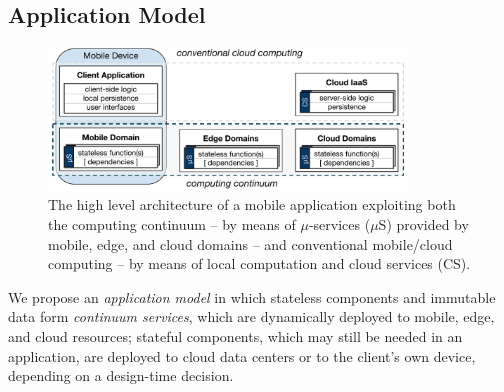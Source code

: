 




\subsection{Application Model}\label{sec:application_model}

\begin{figure}[tbp]
	\includegraphics[width=0.85\textwidth]{figs/Continuum-arch}
	\setlength{\belowcaptionskip}{-10pt}
	\caption{The high level architecture of a mobile application exploiting both the computing continuum -- by means of $\mu$-services ($\mu$S) provided by mobile, edge, and cloud domains -- and conventional mobile/cloud computing -- by means of local computation and cloud services (CS).}
	\label{fig:Continuum-arch}
\end{figure}


We propose an \textit{application model} in which stateless components and immutable data form \textit{continuum services}, which are dynamically deployed to mobile, edge, and cloud resources; stateful components, which may still be needed in an application, are deployed to cloud data centers or to the client's own device, depending on a design-time decision. 

